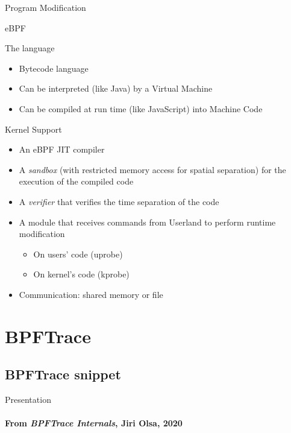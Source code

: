 \begin{reveals}
\begin{frame}[c,fragile]{Program Modification}
\end{frame}

\begin{frame}[c]{eBPF}
  
  \begin{block}{The language}
    \begin{itemize}
    \item Bytecode language
    \item Can be interpreted (like Java) by a Virtual Machine
    \item Can be compiled at run time (like JavaScript) into Machine Code 
    \end{itemize}
  \end{block}


  \begin{block}{Kernel Support}
    \begin{itemize}
    \item An eBPF JIT compiler
    \item A \emph{sandbox} (with restricted memory access for spatial
      separation) for the execution of the compiled code
    \item A \emph{verifier} that verifies the time separation of the code
    \item A module that receives commands from Userland to perform
      runtime modification
      \begin{itemize}
      \item On users' code (uprobe)
      \item On kernel's code (kprobe)
      \end{itemize}
    \item Communication: shared memory or file
    \end{itemize}
  \end{block}


\end{frame}



\section{BPFTrace}

\subsection{BPFTrace snippet}


\begin{frame}[c]{Presentation}
  \framesubtitle{From \emph{BPFTrace Internals}, Jiri Olsa, 2020} 
  

\end{frame}
\end{reveals}
